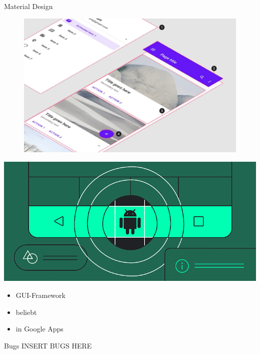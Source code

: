\documentclass[aspectratio=169]{beamer}
\begin{document}
\begin{frame}[plain]{Material Design}
\begin{varwidth}{.5\textwidth}
        \begin{figure}
            \centering
            \includegraphics[width=\textwidth]{media/material-design-in-action.jpg}
        \end{figure}
    \end{varwidth}
    \hfill
    \begin{varwidth}{.4\textwidth}
        \includegraphics[width=\textwidth]{media/material-android.png}
        \begin{itemize}\pause
            \item GUI-Framework\pause
            \item beliebt\pause
            \item in Google Apps
        \end{itemize}
    \end{varwidth}
\end{frame}

\begin{frame}[plain]{Bugs}
INSERT BUGS HERE
\end{frame}
\end{document}
